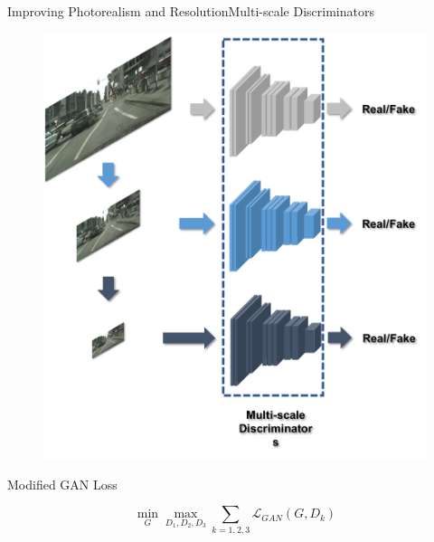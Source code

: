 \documentclass{beamer}
\begin{document}
\begin{frame}{Improving Photorealism and Resolution}{Multi-scale  Discriminators}
	\begin{figure}
	\centering
	\includegraphics[height=0.6\textheight]{images/multi-scale}
\end{figure}
%
%
\begin{beamerboxesrounded}[upper=uppercol,lower=lowercol,shadow=false]{Modified GAN Loss}

\begin{equation}
\min_G\max_{D_1,D_2,D_3}\sum_{k=1,2,3} \mathcal{L}_{GAN}(G,D_k)
\end{equation}
\end{beamerboxesrounded}

\end{frame}
\end{document}
